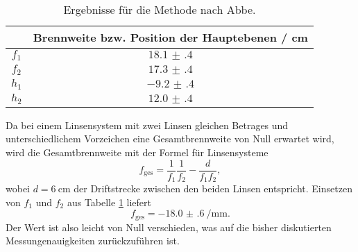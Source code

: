 \begin{table}
  \centering
  \caption{Ergebnisse für die Methode nach Abbe.}
  \label{tab:diskusii}
  \begin{tabular}{cc}
    \toprule
	  & Brennweite bzw. Position der Hauptebenen / \si{\centi\meter} \\
    \midrule
	$f_{1}$ & $\num{18.1(4)}$ \\
	$f_{2}$ & $\num{17.3(4)}$ \\
	$h_1$ & $-\num{9.2(4)}$ \\
	$h_2$ & $\num{12.0(4)}$ \\
\bottomrule
\end{tabular}
\end{table}
Da bei einem Linsensystem mit zwei Linsen gleichen Betrages und unterschiedlichem Vorzeichen 
eine Gesamtbrennweite von Null erwartet wird, wird die Gesamtbrennweite mit der Formel für
Linsensysteme
\begin{equation}
	f_{\mathrm{ges}} = \frac{1}{f_1}\frac{1}{f_2}-\frac{d}{f_1f_2} \mathrm{,}
\end{equation}
wobei $d=\SI{6}{\centi\meter}$ der Driftstrecke zwischen den beiden Linsen entspricht.
Einsetzen von $f_1$ und $f_2$ aus Tabelle \ref{tab:diskusii} liefert
\begin{equation*}
	f_{\mathrm{ges}} = -\SI{18.0(6)}{\per\milli\meter} \mathrm{.}
\end{equation*}
Der Wert ist also leicht von Null verschieden, was auf die bisher diskutierten Messungenauigkeiten
zurückzuführen ist.



